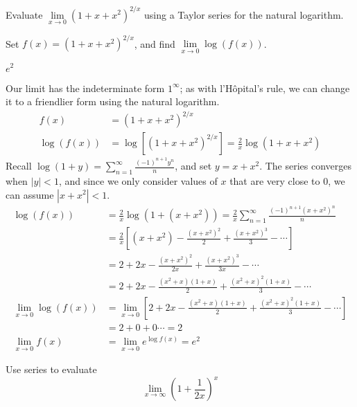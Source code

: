 \begin{question}\label{prob_s3.6_indet}
Evaluate
$\displaystyle \lim\limits_{x\rightarrow 0}\left(1+x+x^2\right)^{2/x}$ using a Taylor series for the natural logarithm.
\end{question}

\begin{hint}
Set $f(x)=\left(1+x+x^2\right)^{2/x}$, and find $ \lim\limits_{x\rightarrow 0}\log\left(f(x)\right)$.
\end{hint}

\begin{answer}
$e^2$
\end{answer}

\begin{solution}
Our limit has the indeterminate form $1^{\infty}$; as with l'H\^{o}pital's rule, we can change it to a friendlier form using the natural logarithm.
\begin{align*}
f(x)&=\left(1+x+x^2\right)^{2/x}\\
\log(f(x))&=\log\left[\left(1+x+x^2\right)^{2/x}\right]=\frac{2}{x}\log\left(1+x+x^2\right)
\end{align*}
Recall $\log(1+y)=\displaystyle\sum_{n=1}^\infty \frac{(-1)^{n+1}y^n}{n}$, and set $y=x+x^2$. The series converges when $|y|<1$, and since we only consider values of $x$ that are very close to 0, we can assume $|x+x^2|<1$.
\begin{align*}
\log(f(x))&=\frac{2}{x}\log\left(1+(x+x^2)\right)=\frac{2}{x}\sum_{n=1}^\infty\frac{(-1)^{n+1}(x+x^2)^n}{n}\\
&=\frac{2}{x}\left[(x+x^2)-\frac{(x+x^2)^2}{2}+\frac{(x+x^2)^3}{3}-\cdots\right]\\
&=2+2x-\frac{(x+x^2)^2}{2x}+\frac{(x+x^2)^3}{3x}-\cdots\\
&=2+2x-\frac{(x^2+x)(1+x)}{2}+\frac{(x^2+x)^2(1+x)}{3}-\cdots\\
\lim_{x \to 0}\log(f(x))&=\lim_{x \to 0}\left[2+2x-\frac{(x^2+x)(1+x)}{2}+\frac{(x^2+x)^2(1+x)}{3}-\cdots\right]	\\
&=2+0+0\cdots=2\\
\lim_{x \to 0} f(x)&=\lim_{x \to 0}e^{\log f(x)}=e^2
\end{align*}
\end{solution}


\begin{question}
Use series to evaluate
\[\lim_{x \to \infty} \left(1+\frac{1}{2x}\right)^{x}\]
\end{question}

